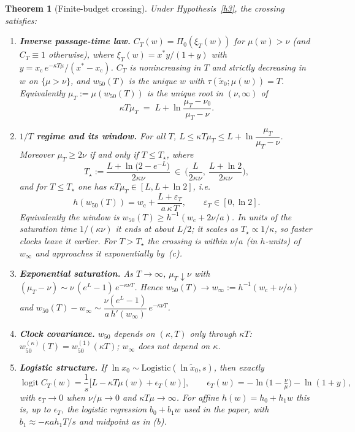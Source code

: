 \documentclass[11pt]{article}
\newtheorem{theorem}{Theorem}
\theoremstyle{definition}
\theoremstyle{remark}
\newcommand{\wcrit}{w_{\mathrm c}}
\newcommand{\wfifty}{w_{50}}
\newcommand{\xc}{x_{\mathrm c}}
\newcommand{\xmed}{\tilde x_0}
\newcommand{\Tstar}{T_\star}
\newcommand{\logit}{\operatorname{logit}}
\begin{document}
\begin{theorem}[Finite-budget crossing]\label{t1}
Under Hypothesis~\ref{h3}, the crossing satisfies:
\begin{enumerate}[label=(\alph*)]
\item \textbf{Inverse passage-time law.} $C_T(w)=\Pi_0(\xi_T(w))$ for $\mu(w)>\nu$ (and $C_T\equiv1$ otherwise), where $\xi_T(w)=x^*y/(1+y)$ with $y=\xc\,e^{-\kappa T\mu}/(x^*-\xc)$. $C_T$ is nonincreasing in $T$ and strictly decreasing in $w$ on $\{\mu>\nu\}$, and $\wfifty(T)$ is the unique $w$ with $\tau(\xmed;\mu(w))=T$. Equivalently $\mu_T:=\mu(\wfifty(T))$ is the unique root in $(\nu,\infty)$ of
\[
\kappa T\mu_T\;=\;L+\ln\frac{\mu_T-\nu_0}{\mu_T-\nu}. \tag{E}
\]
\item \textbf{$1/T$ regime and its window.} For all $T$, $L\le\kappa T\mu_T\le L+\ln\dfrac{\mu_T}{\mu_T-\nu}$. Moreover $\mu_T\ge2\nu$ if and only if $T\le\Tstar$, where
\[
\Tstar:=\frac{L+\ln\!\big(2-e^{-L}\big)}{2\kappa\nu}\ \in\ \Big(\frac{L}{2\kappa\nu},\ \frac{L+\ln2}{2\kappa\nu}\Big),
\]
and for $T\le\Tstar$ one has $\kappa T\mu_T\in[L,L+\ln2]$, i.e.
\[
h(\wfifty(T))=\wcrit+\frac{L+\varepsilon_T}{a\,\kappa\,T},\qquad \varepsilon_T\in[0,\ln2].
\]
Equivalently the window is $\wfifty(T)\ge h^{-1}(\wcrit+2\nu/a)$. In units of the saturation time $1/(\kappa\nu)$ it ends at about $L/2$; it scales as $\Tstar\propto1/\kappa$, so faster clocks leave it earlier. For $T>\Tstar$ the crossing is within $\nu/a$ (in $h$-units) of $w_\infty$ and approaches it exponentially by~(c).
\item \textbf{Exponential saturation.} As $T\to\infty$, $\mu_T\downarrow\nu$ with $(\mu_T-\nu)\sim\nu\,(e^{L}-1)\,e^{-\kappa\nu T}$. Hence $\wfifty(T)\to w_\infty:=h^{-1}(\wcrit+\nu/a)$ and $\wfifty(T)-w_\infty\sim\dfrac{\nu(e^L-1)}{a\,h'(w_\infty)}\,e^{-\kappa\nu T}$.
\item \textbf{Clock covariance.} $\wfifty$ depends on $(\kappa,T)$ only through $\kappa T$: $\wfifty^{(\kappa)}(T)=\wfifty^{(1)}(\kappa T)$; $w_\infty$ does not depend on $\kappa$.
\item \textbf{Logistic structure.} If $\ln x_0\sim\mathrm{Logistic}(\ln\xmed,s)$, then exactly
\[
\logit C_T(w)=\frac1s\Big[L-\kappa T\mu(w)+\epsilon_T(w)\Big],\qquad \epsilon_T(w)=-\ln\!\big(1-\tfrac{\nu}{\mu}\big)-\ln(1+y),
\]
with $\epsilon_T\to0$ when $\nu/\mu\to0$ and $\kappa T\mu\to\infty$. For affine $h(w)=h_0+h_1w$ this is, up to $\epsilon_T$, the logistic regression $b_0+b_1w$ used in the paper, with $b_1\approx-\kappa a h_1T/s$ and midpoint as in (b).
\end{enumerate}
\end{theorem}
\end{document}
